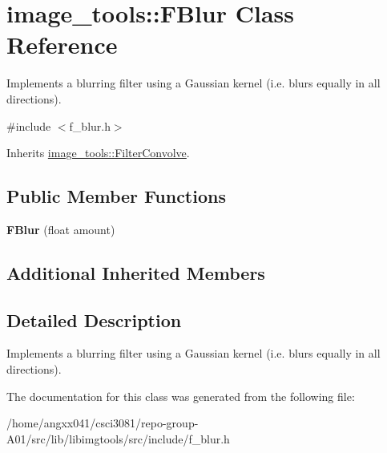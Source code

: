 \hypertarget{classimage__tools_1_1FBlur}{}\section{image\+\_\+tools\+:\+:F\+Blur Class Reference}
\label{classimage__tools_1_1FBlur}


Implements a blurring filter using a Gaussian kernel (i.\+e. blurs equally in all directions).  




{\ttfamily \#include $<$f\+\_\+blur.\+h$>$}



Inherits \hyperlink{classimage__tools_1_1FilterConvolve}{image\+\_\+tools\+::\+Filter\+Convolve}.

\subsection*{Public Member Functions}
\begin{DoxyCompactItemize}
\item 
{\bfseries F\+Blur} (float amount)\hypertarget{classimage__tools_1_1FBlur_a0237596cbd706a38d71e517c0291d3d1}{}\label{classimage__tools_1_1FBlur_a0237596cbd706a38d71e517c0291d3d1}

\end{DoxyCompactItemize}
\subsection*{Additional Inherited Members}


\subsection{Detailed Description}
Implements a blurring filter using a Gaussian kernel (i.\+e. blurs equally in all directions). 

The documentation for this class was generated from the following file\+:\begin{DoxyCompactItemize}
\item 
/home/angxx041/csci3081/repo-\/group-\/\+A01/src/lib/libimgtools/src/include/f\+\_\+blur.\+h\end{DoxyCompactItemize}
